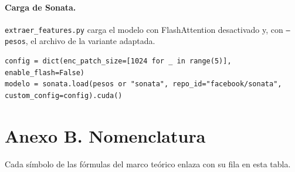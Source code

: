 \paragraph*{Carga de Sonata.}
\texttt{extraer\_features.py} carga el modelo con FlashAttention desactivado y, con
\texttt{--pesos}, el archivo de la variante adaptada.
\begin{lstlisting}[style=comando]
config = dict(enc_patch_size=[1024 for _ in range(5)], enable_flash=False)
modelo = sonata.load(pesos or "sonata", repo_id="facebook/sonata", custom_config=config).cuda()
\end{lstlisting}


\section*{Anexo B. Nomenclatura}

\label{sec:anexo-nomenclatura}
Cada símbolo de las fórmulas del marco teórico enlaza con su fila en esta tabla.

